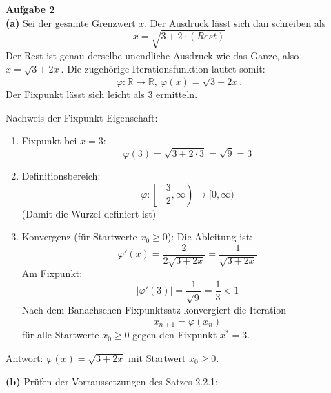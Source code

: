 \documentclass[a4paper,12pt]{article}
\begin{document}
\raggedright
\doublespacing
\noindent\textbf{Aufgabe 2} \\
\noindent\textbf{(a)} Sei der gesamte Grenzwert $x$. Der Ausdruck lässt sich dan schreiben als 
$$x= \sqrt{3+2⋅(Rest)}$$
Der Rest ist genau derselbe unendliche Ausdruck wie das Ganze, also $x= \sqrt{3+2x}$.
Die zugehörige Iterationsfunktion lautet somit: 
$$\varphi: \mathbb{R} \rightarrow \mathbb{R}, \ \varphi(x) = \sqrt{3 + 2x}.$$
Der Fixpunkt lässt sich leicht als $3$ ermitteln.

Nachweis der Fixpunkt-Eigenschaft:

\begin{enumerate}
    \item Fixpunkt bei $x = 3$:
    \[
    \varphi(3) = \sqrt{3 + 2 \cdot 3} = \sqrt{9} = 3 
    \]

    \item Definitionsbereich:
    \[
    \varphi : \left[-\frac{3}{2}, \infty\right) \to [0, \infty)
    \]
    (Damit die Wurzel definiert ist)

    \item Konvergenz (für Startwerte $x_0 \geq 0$):
    Die Ableitung ist:
    \[
    \varphi'(x) = \frac{2}{2\sqrt{3 + 2x}} = \frac{1}{\sqrt{3 + 2x}}
    \]
    Am Fixpunkt:
    \[
    |\varphi'(3)| = \frac{1}{\sqrt{9}} = \frac{1}{3} < 1
    \]
    Nach dem Banachschen Fixpunktsatz konvergiert die Iteration
    \[
    x_{n+1} = \varphi(x_n)
    \]
    für alle Startwerte $x_0 \geq 0$ gegen den Fixpunkt $x^* = 3$.
\end{enumerate}

Antwort: $\varphi(x) = \sqrt{3 + 2x}$ mit Startwert $x_0 \geq 0$.

\noindent\textbf{(b)} Prüfen der Vorraussetzungen des Satzes 2.2.1:
\end{document}
